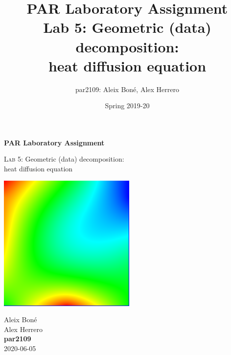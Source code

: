 

\usepackage[justification=centering]{caption}
\usepackage{subcaption}
\usepackage{graphicx}
\usepackage{enumitem}
\usepackage{lipsum}

\usepackage{siunitx}
\usepackage{hyphenat}

\usepackage{xcolor}


\usepackage[newfloat]{minted}
\captionsetup[listing]{position=top}

\graphicspath{{figures/}}


\renewcommand\theadfont{\bfseries}

\title{
    PAR Laboratory Assignment\\
    Lab 5: Geometric (data) decomposition: \\
    heat diffusion equation
}

\author{
    par2109:
    Aleix Boné,
    Alex Herrero
}

\date{
    Spring 2019-20
}



\thispagestyle{empty}
\clearpage
\setcounter{page}{-1}

\begin{titlepage}
{%
    \centering
    \null{}
    \vfill
    {\Huge \bfseries PAR Laboratory Assignment\par}
    \vspace{3em}
    {\Large {\scshape Lab 5:} 
    Geometric (data) decomposition: \\
    heat diffusion equation
\par}
    \vfill

    \includegraphics{images/jacobi}

    \vfill
    {\raggedleft{} \Large
        Aleix Boné\\
        Alex Herrero\\
        {\bfseries\ttfamily par2109}\\
        \vspace{4em}
        2020-06-05 %
        \par}
}
\end{titlepage}

